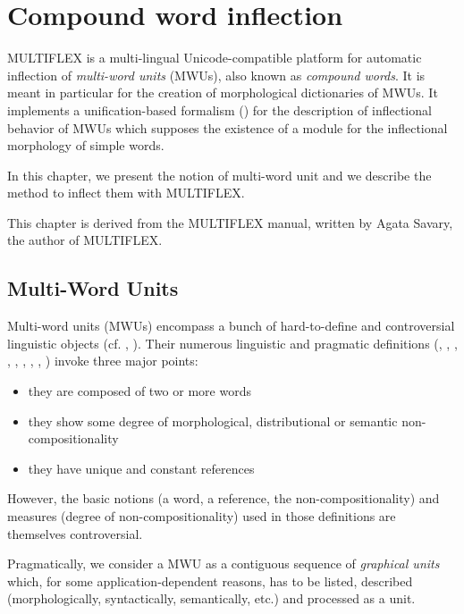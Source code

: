 \chapter{Compound word inflection}

\label{chap-multiflex}
MULTIFLEX is a multi-lingual Unicode-compatible platform for automatic inflection of 
\textit{multi-word units} (MWUs), also known as \textit{compound words}. It is
meant in particular for the creation of morphological dictionaries of MWUs. 
It implements a unification-based formalism (\cite{Savary05}) 
for the description of inflectional behavior of MWUs which supposes the
existence of a module for the inflectional morphology of simple words.
 
\bigskip
\noindent In this chapter, we present the notion of multi-word unit and we
describe the method to inflect them with MULTIFLEX. 

\bigskip
\noindent This chapter is derived from the MULTIFLEX manual, written by Agata
Savary, the author of MULTIFLEX.

\section{Multi-Word Units}
\label{section:MWUs}
Multi-word units (MWUs) encompass a bunch of hard-to-define and controversial 
linguistic objects (cf. \cite{HabertJacquemin93}, \cite{Corbin92}). Their numerous 
linguistic and pragmatic definitions (\cite{Benven74}, \cite{Downing77}, \cite{Levi78}, 
\cite{Bauer83}, \cite{Gross90}, \cite{Anscombre90}, \cite{max-1993},
\cite{Gross96}, \cite{Cadiot92}) invoke three major points:

\begin{itemize}
\item they are composed of two or more words
\item they show some degree of morphological, distributional or semantic non-compositionality
\item they have unique and constant references 
\end{itemize}

\bigskip
\noindent However, the basic notions (a word, a reference, the
non-compositionality) and measures (degree of non-compositionality) used 
in those definitions are themselves controversial.

\bigskip
\noindent Pragmatically, we consider a MWU as a 
contiguous sequence of \textit{graphical units} which,
for some application-dependent reasons, has to be listed, described 
(morphologically, syntactically, semantically, etc.) 
and processed as a unit.

